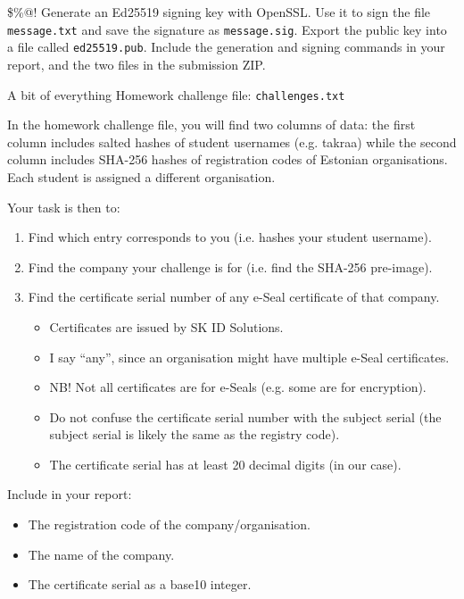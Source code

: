\documentclass{homework}
\begin{document}
\begin{task}{\$\%@!}
  Generate an Ed25519 signing key with OpenSSL.
  Use it to sign the file \texttt{message.txt} and save the signature as \texttt{message.sig}.
  Export the public key into a file called \texttt{ed25519.pub}.
  Include the generation and signing commands in your report, and the two files in the submission ZIP.
\end{task}

\newpage

\begin{task}{A bit of everything}
  Homework challenge file: \texttt{challenges.txt}

  In the homework challenge file, you will find two columns of data: the first column includes salted hashes of student usernames (e.g. takraa) while the second column includes SHA-256 hashes of registration codes of Estonian organisations.
  Each student is assigned a different organisation.

  Your task is then to:
  \begin{enumerate}
    \item Find which entry corresponds to you (i.e. hashes your student username).
    \item Find the company your challenge is for (i.e. find the SHA-256 pre-image).
    \item Find the certificate serial number of any e-Seal certificate of that company.
    \begin{itemize}
      \item Certificates are issued by SK ID Solutions.
      \item I say \enquote{any}, since an organisation might have multiple e-Seal certificates.
      \item NB! Not all certificates are for e-Seals (e.g. some are for encryption).
      \item Do not confuse the certificate serial number with the subject serial (the subject serial is likely the same as the registry code).
      \item The certificate serial has at least 20 decimal digits (in our case).
    \end{itemize}
  \end{enumerate}

  Include in your report:
  \begin{itemize}
    \item The registration code of the company/organisation.
    \item The name of the company.
    \item The certificate serial as a base10 integer.
  \end{itemize}


\end{task}
\end{document}
